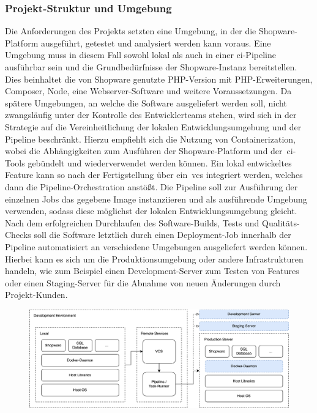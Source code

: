 \subsubsection{Projekt-Struktur und Umgebung}

Die Anforderungen des Projekts setzten eine Umgebung, in der die Shopware-Platform ausgeführt, getestet und analysiert
werden kann voraus.
Eine Umgebung muss in diesem Fall sowohl lokal als auch in einer \acrshort{ci}-Pipeline ausführbar sein und die
Grundbedürfnisse der Shopware-Instanz bereitstellen.
Dies beinhaltet die von Shopware genutzte PHP-Version mit PHP-Erweiterungen, Composer, Node, eine
Webserver-Software und weitere Voraussetzungen.
Da spätere Umgebungen, an welche die Software ausgeliefert werden soll, nicht zwangsläufig unter der
Kontrolle des Entwicklerteams stehen, wird sich in der Strategie auf die Vereinheitlichung der lokalen
Entwicklungsumgebung und der Pipeline beschränkt.
Hierzu empfiehlt sich die Nutzung von Containerization, wobei die Abhängigkeiten zum Ausführen der Shopware-Platform
und der\ \acrshort{ci}-Tools gebündelt und wiederverwendet werden können.
Ein lokal entwickeltes Feature kann so nach der Fertigstellung über ein\ \acrshort{vcs} integriert werden, welches dann
die Pipeline-Orchestration anstößt.
Die Pipeline soll zur Ausführung der einzelnen Jobs das gegebene Image instanziieren und als ausführende
Umgebung verwenden, sodass diese möglichst der lokalen Entwicklungsumgebung gleicht.
Nach dem erfolgreichen Durchlaufen des Software-Builds, Tests und Qualitäts-Checks soll die Software letztlich durch
einen Deployment-Job innerhalb der Pipeline automatisiert an verschiedene Umgebungen ausgeliefert werden können.
Hierbei kann es sich um die Produktionsumgebung oder andere Infrastrukturen handeln, wie zum Beispiel einen
Development-Server zum Testen von Features oder einen Staging-Server für die Abnahme von neuen Änderungen durch
Projekt-Kunden.

\begin{figure}[H]
    \centering
    \includegraphics[width=\textwidth]{images/content/ci-architecture-concept}
    \label{fig:ci-architecture-concept}
\end{figure}

